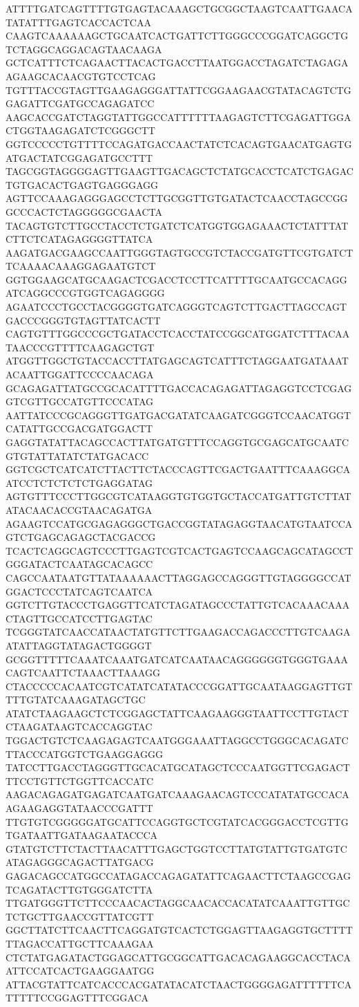 ATTTTGATCAGTTTTGTGAGTACAAAGCTGCGGCTAAGTCAATTGAACATATATTTGAGTCACCACTCAA
CAAGTCAAAAAAGCTGCAATCACTGATTCTTGGGCCCGGATCAGGCTGTCTAGGCAGGACAGTAACAAGA
GCTCATTTCTCAGAACTTACACTGACCTTAATGGACCTAGATCTAGAGAAGAAGCACAACGTGTCCTCAG
TGTTTACCGTAGTTGAAGAGGGATTATTCGGAAGAACGTATACAGTCTGGAGATTCGATGCCAGAGATCC
AAGCACCGATCTAGGTATTGGCCATTTTTTAAGAGTCTTCGAGATTGGACTGGTAAGAGATCTCGGGCTT
GGTCCCCCTGTTTTCCAGATGACCAACTATCTCACAGTGAACATGAGTGATGACTATCGGAGATGCCTTT
TAGCGGTAGGGGAGTTGAAGTTGACAGCTCTATGCACCTCATCTGAGACTGTGACACTGAGTGAGGGAGG
AGTTCCAAAGAGGGAGCCTCTTGCGGTTGTGATACTCAACCTAGCCGGGCCCACTCTAGGGGGCGAACTA
TACAGTGTCTTGCCTACCTCTGATCTCATGGTGGAGAAACTCTATTTATCTTCTCATAGAGGGGTTATCA
AAGATGACGAAGCCAATTGGGTAGTGCCGTCTACCGATGTTCGTGATCTTCAAAACAAAGGAGAATGTCT
GGTGGAAGCATGCAAGACTCGACCTCCTTCATTTTGCAATGCCACAGGATCAGGCCCGTGGTCAGAGGGG
AGAATCCCTGCCTACGGGGTGATCAGGGTCAGTCTTGACTTAGCCAGTGACCCGGGTGTAGTTATCACTT
CAGTGTTTGGCCCGCTGATACCTCACCTATCCGGCATGGATCTTTACAATAACCCGTTTTCAAGAGCTGT
ATGGTTGGCTGTACCACCTTATGAGCAGTCATTTCTAGGAATGATAAATACAATTGGATTCCCCAACAGA
GCAGAGATTATGCCGCACATTTTGACCACAGAGATTAGAGGTCCTCGAGGTCGTTGCCATGTTCCCATAG
AATTATCCCGCAGGGTTGATGACGATATCAAGATCGGGTCCAACATGGTCATATTGCCGACGATGGACTT
GAGGTATATTACAGCCACTTATGATGTTTCCAGGTGCGAGCATGCAATCGTGTATTATATCTATGACACC
GGTCGCTCATCATCTTACTTCTACCCAGTTCGACTGAATTTCAAAGGCAATCCTCTCTCTCTGAGGATAG
AGTGTTTCCCTTGGCGTCATAAGGTGTGGTGCTACCATGATTGTCTTATATACAACACCGTAACAGATGA
AGAAGTCCATGCGAGAGGGCTGACCGGTATAGAGGTAACATGTAATCCAGTCTGAGCAGAGCTACGACCG
TCACTCAGGCAGTCCCTTGAGTCGTCACTGAGTCCAAGCAGCATAGCCTGGGATACTCAATAGCACAGCC
CAGCCAATAATGTTATAAAAAACTTAGGAGCCAGGGTTGTAGGGGCCATGGACTCCCTATCAGTCAATCA
GGTCTTGTACCCTGAGGTTCATCTAGATAGCCCTATTGTCACAAACAAACTAGTTGCCATCCTTGAGTAC
TCGGGTATCAACCATAACTATGTTCTTGAAGACCAGACCCTTGTCAAGAATATTAGGTATAGACTGGGGT
GCGGTTTTTCAAATCAAATGATCATCAATAACAGGGGGGTGGGTGAAACAGTCAATTCTAAACTTAAAGG
CTACCCCCACAATCGTCATATCATATACCCGGATTGCAATAAGGAGTTGTTTTGTATCAAAGATAGCTGC
ATATCTAAGAAGCTCTCGGAGCTATTCAAGAAGGGTAATTCCTTGTACTCTAAGATAAGTCACCAGGTAC
TGGACTGTCTCAAGAGAGTCAATGGGAAATTAGGCCTGGGCACAGATCTTACCCATGGTCTGAAGGAGGG
TATCCTTGACCTAGGGTTGCACATGCATAGCTCCCAATGGTTCGAGACTTTCCTGTTCTGGTTCACCATC
AAGACAGAGATGAGATCAATGATCAAAGAACAGTCCCATATATGCCACAAGAAGAGGTATAACCCGATTT
TTGTGTCGGGGGATGCATTCCAGGTGCTCGTATCACGGGACCTCGTTGTGATAATTGATAAGAATACCCA
GTATGTCTTCTACTTAACATTTGAGCTGGTCCTTATGTATTGTGATGTCATAGAGGGCAGACTTATGACG
GAGACAGCCATGGCCATAGACCAGAGATATTCAGAACTTCTAAGCCGAGTCAGATACTTGTGGGATCTTA
TTGATGGGTTCTTCCCAACACTAGGCAACACCACATATCAAATTGTTGCTCTGCTTGAACCGTTATCGTT
GGCTTATCTTCAACTTCAGGATGTCACTCTGGAGTTAAGAGGTGCTTTTTTAGACCATTGCTTCAAAGAA
CTCTATGAGATACTGGAGCATTGCGGCATTGACACAGAAGGCACCTACAATTCCATCACTGAAGGAATGG
ATTACGTATTCATCACCCACGATATACATCTAACTGGGGAGATTTTTTCATTTTTCCGGAGTTTCGGACA
